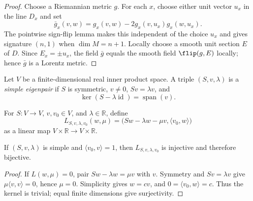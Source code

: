 \begin{proof}
\leanok
{}
\sketch Choose a Riemannian metric $g$. For each $x$, choose either unit vector
$u_x$ in the line $D_x$ and set
\[
\bar g_x(v,w)=g_x(v,w)-2g_x(v,u_x)g_x(w,u_x).
\]
The pointwise sign-flip lemma makes this independent of the choice $u_x$ and gives
signature $(n,1)$ when $\dim M=n+1$. Locally choose a smooth unit section $E$ of
$D$. Since $E_x=\pm u_x$, the field $\bar g$ equals the smooth field
$\flip(g,E)$ locally; hence $\bar g$ is a Lorentz metric.
\end{proof}

\begin{definition}
\label{def:simple-eigenpair}
\leanok
Let $V$ be a finite-dimensional real inner product space. A triple
$(S,v,\lambda)$ is a \emph{simple eigenpair} if $S$ is symmetric, $v\ne0$,
$Sv=\lambda v$, and
\[
\ker(S-\lambda\operatorname{id})=\operatorname{span}(v).
\]
\end{definition}

\begin{definition}
\label{def:eigen-linearisation}
\leanok
For $S\colon V\to V$, $v,v_0\in V$, and $\lambda\in\mathbb R$, define
\[
L_{S,v,\lambda,v_0}(w,\mu)
=\bigl(Sw-\lambda w-\mu v,\langle v_0,w\rangle\bigr)
\]
as a linear map $V\times\mathbb R\to V\times\mathbb R$.
\end{definition}

\begin{lemma}
\label{lem:eigen-linearisation-injective}
\leanok
{}
If $(S,v,\lambda)$ is simple and $\langle v_0,v\rangle=1$, then
$L_{S,v,\lambda,v_0}$ is injective and therefore bijective.
\end{lemma}

\begin{proof}
\leanok
{}
\sketch If $L(w,\mu)=0$, pair $Sw-\lambda w=\mu v$ with $v$. Symmetry and
$Sv=\lambda v$ give $\mu\langle v,v\rangle=0$, hence $\mu=0$. Simplicity gives
$w=cv$, and $0=\langle v_0,w\rangle=c$. Thus the kernel is trivial; equal finite
dimensions give surjectivity.
\end{proof}

